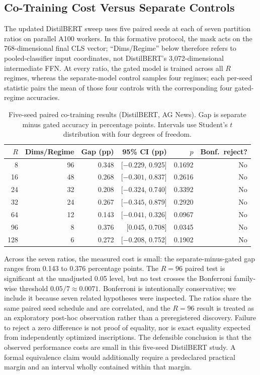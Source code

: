 \documentclass[11pt,a4paper]{article}
\begin{document}
\subsection{Co-Training Cost Versus Separate Controls}
\label{sec:series1}

The updated DistilBERT sweep uses five paired seeds at each of seven
partition ratios on parallel A100 workers.  In this formative
protocol, the mask acts on the 768-dimensional final CLS vector;
``Dims/Regime'' below therefore refers to pooled-classifier input
coordinates, not DistilBERT's 3,072-dimensional intermediate FFN.
At every ratio, the gated model is trained across all $R$ regimes,
whereas the separate-model control samples four regimes; each
per-seed statistic pairs the mean of those four controls with the
corresponding four gated-regime accuracies.

\begin{table}[ht]
\centering
\caption{Five-seed paired co-training results (DistilBERT, AG News).
Gap is separate minus gated accuracy in percentage points.  Intervals
use Student's $t$ distribution with four degrees of freedom.}
\label{tab:series1}
\small
\begin{tabular}{@{}rrrrrr@{}}
\toprule
$R$ & Dims/Regime & Gap (pp) & 95\% CI (pp) & $p$ & Bonf.\ reject? \\
\midrule
8   & 96 & 0.348 & [$-0.229$, 0.925] & 0.1692 & No \\
16  & 48 & 0.268 & [$-0.301$, 0.837] & 0.2616 & No \\
24  & 32 & 0.208 & [$-0.324$, 0.740] & 0.3392 & No \\
32  & 24 & 0.267 & [$-0.345$, 0.879] & 0.2920 & No \\
64  & 12 & 0.143 & [$-0.041$, 0.326] & 0.0967 & No \\
96  & 8  & 0.376 & [0.045, 0.708]    & 0.0345 & No \\
128 & 6  & 0.272 & [$-0.208$, 0.752] & 0.1902 & No \\
\bottomrule
\end{tabular}
\end{table}

Across the seven ratios, the measured cost is small: the
separate-minus-gated gap ranges from 0.143 to 0.376 percentage
points.  The $R{=}96$ paired test is significant at the unadjusted
0.05 level, but no test crosses the Bonferroni family-wise threshold
$0.05/7 \approx 0.0071$.  Bonferroni is intentionally conservative;
we include it because seven related hypotheses were inspected.  The
ratios share the same paired seed schedule and are correlated, and
the $R{=}96$ result is treated as an exploratory post-hoc observation
rather than a preregistered discovery.
Failure to reject a zero difference is not proof of equality, nor is
exact equality expected from independently optimized inscriptions.
The defensible conclusion is that the observed performance costs are
small in this five-seed DistilBERT study.  A formal equivalence claim
would additionally require a predeclared practical margin and an
interval wholly contained within that margin.
\end{document}
